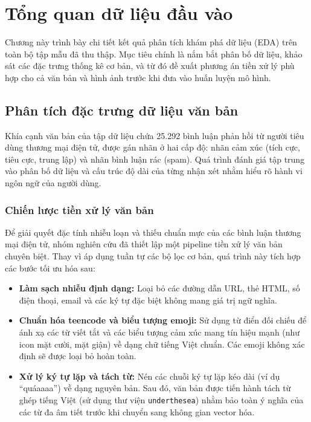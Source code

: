 \section{Tổng quan dữ liệu đầu vào}

Chương này trình bày chi tiết kết quả phân tích khám phá dữ liệu (EDA) trên toàn bộ tập mẫu đã thu thập. Mục tiêu chính là nắm bắt phân bố dữ liệu, khảo sát các đặc trưng thống kê cơ bản, và từ đó đề xuất phương án tiền xử lý phù hợp cho cả văn bản và hình ảnh trước khi đưa vào huấn luyện mô hình.

\subsection{Phân tích đặc trưng dữ liệu văn bản}

Khía cạnh văn bản của tập dữ liệu chứa 25.292 bình luận phản hồi từ người tiêu dùng thương mại điện tử, được gán nhãn ở hai cấp độ: nhãn cảm xúc (tích cực, tiêu cực, trung lập) và nhãn bình luận rác (spam). Quá trình đánh giá tập trung vào phân bố dữ liệu và cấu trúc độ dài của từng nhận xét nhằm hiểu rõ hành vi ngôn ngữ của người dùng.

\subsubsection{Chiến lược tiền xử lý văn bản}

Để giải quyết đặc tính nhiễu loạn và thiếu chuẩn mực của các bình luận thương mại điện tử, nhóm nghiên cứu đã thiết lập một pipeline tiền xử lý văn bản chuyên biệt. Thay vì áp dụng tuần tự các bộ lọc cơ bản, quá trình này tích hợp các bước tối ưu hóa sau:
\begin{itemize}[labelsep=10pt, leftmargin=2cm]
    \item \textbf{Làm sạch nhiễu định dạng:} Loại bỏ các đường dẫn URL, thẻ HTML, số điện thoại, email và các ký tự đặc biệt không mang giá trị ngữ nghĩa.
    \item \textbf{Chuẩn hóa teencode và biểu tượng emoji:} Sử dụng từ điển đối chiếu để ánh xạ các từ viết tắt và các biểu tượng cảm xúc mang tín hiệu mạnh (như icon mặt cười, mặt giận) về dạng chữ tiếng Việt chuẩn. Các emoji không xác định sẽ được loại bỏ hoàn toàn.
    \item \textbf{Xử lý ký tự lặp và tách từ:} Nén các chuỗi ký tự lặp kéo dài (ví dụ ``quáaaaa'') về dạng nguyên bản. Sau đó, văn bản được tiến hành tách từ ghép tiếng Việt (sử dụng thư viện \texttt{underthesea}) nhằm bảo toàn ý nghĩa của các từ đa âm tiết trước khi chuyển sang không gian vector hóa.
\end{itemize}

